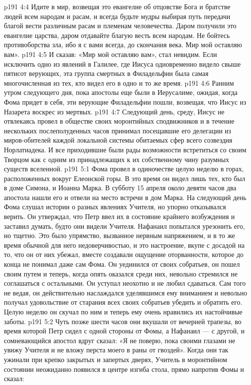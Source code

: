 \vs p191 4:4 Идите в мир, возвещая это евангелие об отцовстве Бога и братстве людей всем народам и расам, и всегда будьте мудры выбирая путь передачи благой вести различным расам и племенам человечества. Даром получили это евангелие царства, даром отдавайте благую весть всем народам. Не бойтесь противоборства зла, ибо я с вами всегда, до скончания века. Мир мой оставляю вам».
\vs p191 4:5 \pc И сказав: «Мир мой оставляю вам», стал невидим. Если исключить одно из явлений в Галилее, где Иисуса одновременно видело свыше пятисот верующих, эта группа смертных в Филадельфии была самая многочисленная из тех, кто видел его в одно и то же время.
\vs p191 4:6 Ранним утром следующего дня, пока апостолы еще были в Иерусалиме, ожидая, когда Фома придет в себя, эти верующие Филадельфии пошли, возвещая, что Иисус из Назарета воскрес из мертвых.
\vs p191 4:7 Следующий день, среду, Иисус не отвлекаясь провел в обществе своих моронтийных сподвижников и в течение нескольких послеполуденных часов принимал посещавшие его делегации из миров\hyp{}обителей каждой локальной системы обитаемых сфер всего созвездия Норлатиадека. И все приходившие были рады возможности встретиться со своим Творцом как с одним из принадлежащих к их собственному чину разумных существ вселенной.
\vs p191 5:1 Фома провел в одиночестве целую неделю в горах, расположенных вокруг Елеонской горы. В это время он видел лишь тех, кто был в доме Симона, и Иоанна Марка. В субботу 15 апреля около девяти часов два апостола нашли его и отвели на место встречи в дом Марка. На следующий день Фома слушал истории о разных явлениях Учителя, но упорно отказывался верить. Он утверждал, что Петр ввел их в состояние крайнего возбуждения и заставил думать, будто они видели Учителя. Нафанаил попытался урезонить его, но тщетно. Это было упрямство, вызванное нервным напряжением, и в то же время обычной для него недоверчивостью, и это настроение, вкупе с досадой на то, что он от них убежал, вместе создавали ощущение оторванности, которое до конца не понимал даже сам Фома. Он уединился от своих собратьев, он пошел своим путем и теперь, когда опять оказался среди них, невольно стремился не соглашаться с остальными. Он уступал неохотно и не любил сдаваться. Сам того не ведая, он действительно наслаждался уделявшимся ему вниманием и невольно получал удовольствие от старания всех своих собратьев убедить и обратить его. Целую неделю он скучал по ним и теперь ему очень нравились их настойчивые заботы.
\vs p191 5:2 Чуть позже шести часов они вкушали от вечерней трапезы, во время которой Петр сидел с одной стороны от Фомы, а Нафанаил --- с другой, и сомневающийся апостол вдруг сказал: «Я не поверю, пока своими глазами не увижу Учителя и не вложу перста моего в раны от гвоздей». Когда они так ужинали при крепко закрытых и запертых дверях, Учитель в моронтийном состоянии неожиданно появился в центре изгиба стола, прямо напротив Фомы и сказал:

